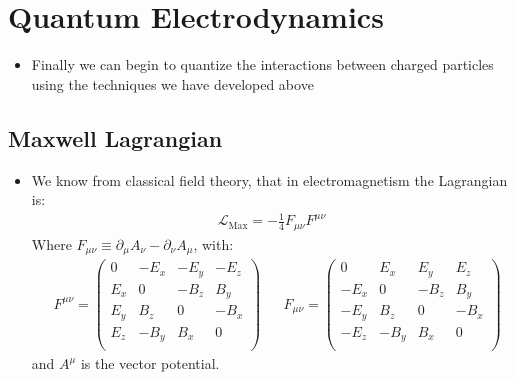 \documentclass[11pt]{article}
\numberwithin{equation}{section}
\begin{document}
\newpage

\section{Quantum Electrodynamics} %
\label{sec:quantum_electrodynamics}
\begin{itemize}
  \item Finally we can begin to quantize the interactions between charged particles using the techniques we have developed above  
\end{itemize}

\subsection{Maxwell Lagrangian} %
\label{sub:maxwell_lagrangian}
\begin{itemize}
  \item We know from classical field theory, that in electromagnetism the Lagrangian is:
  \begin{align*}
       \mathcal{L}_{\text{Max}}  = -\frac{1}{4}F_{\mu\nu}F^{\mu\nu}
     \end{align*}   
     Where $F_{\mu\nu} \equiv \partial_{\mu}A_{\nu}-\partial_{\nu}A_{\mu}$, with: 
\begin{align}
\label{F_mn}
       &  F^{\mu\nu} =  \begin{pmatrix}
       0  & -E_x & -E_y & -E_z \\
       E_x&0& -B_z& B_y   \\
       E_y& B_z& 0 & -B_x \\
      E_z& -B_y& B_x& 0 \\
    \end{pmatrix} 
&       
 & F_{\mu\nu} =  \begin{pmatrix}
       0  & E_x& E_y & E_z \\
       -E_x&0& -B_z& B_y   \\
       -E_y& B_z& 0 & -B_x \\
      -E_z& -B_y& B_x& 0 \\
    \end{pmatrix}
\end{align}
     and $A^{\mu}$ is the vector potential.


\end{itemize}
\end{document}
